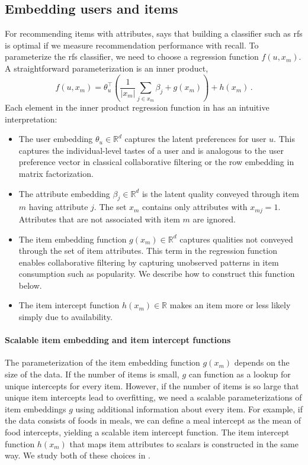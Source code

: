 \subsection{Embedding users and items}
\label{subsec:rankfromsets:embeddings}
For recommending items with attributes,  says that
building a classifier such as \acrlong{rfs} is optimal if we measure
recommendation performance with recall. To parameterize the \gls{rfs}
classifier, we need to choose a regression function $f(u, x_m)$.
A straightforward parameterization is an inner product,
\begin{equation}
\label{eqn:rankfromsets}
  f\left(u, x_m\right) = \theta_u^\top\left(\frac{1}{|x_m|}\sum_{j\in x_m}
  \beta_j + g(x_m)\right) + h(x_m) \, .
\end{equation}
Each element in the inner product regression function in 
has an intuitive interpretation:
\begin{itemize}
\item The user embedding $\theta_u \in \mathbb{R}^d$ captures the latent
  preferences for user $u$. This captures the individual-level tastes of a user
  and is analogous to the user preference vector in classical collaborative
  filtering or the row embedding in matrix factorization.
\item The attribute embedding $\beta_j \in \mathbb{R}^d$ is the latent quality
  conveyed through item $m$ having attribute $j$. The set $x_m$ contains only
  attributes with $x_{mj}=1$. Attributes that are not associated with item $m$
  are ignored.
\item The item embedding function $g(x_m) \in \mathbb{R}^d$ captures qualities
  not conveyed through the set of item attributes. This term in the regression
  function enables collaborative filtering by capturing unobserved patterns in
  item consumption such as popularity. We describe how to construct this
  function below.
\item The item intercept function $h(x_m) \in \mathbb{R}$ makes an item more or
  less likely simply due to availability.
\end{itemize}

\paragraph{Scalable item embedding and item intercept functions} The
parameterization of the item embedding function $g(x_m)$ depends on the size of
the data. If the number of items is small, $g$ can function as a lookup for
unique intercepts for every item. However, if the number of items is so large
that unique item intercepts lead to overfitting, we need a scalable
parameterizations of item embeddings $g$ using additional information about
every item. For example, if the data consists of foods in meals, we can define a
meal intercept as the mean of food intercepts, yielding a scalable item
intercept function. The item intercept function $h(x_m)$ that maps item
attributes to scalars is constructed in the same way. We study both of these
choices in .

